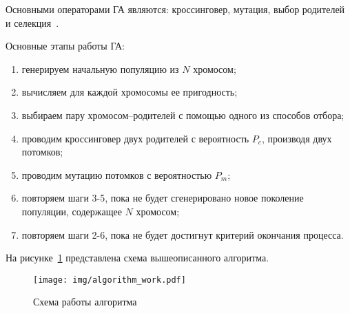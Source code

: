 Основными операторами ГА являются: кроссинговер, мутация, выбор родителей и селекция~\cite{GA}. 

Основные этапы работы ГА:
\begin{enumerate}
	\item генерируем начальную популяцию из $N$ хромосом;
	\item вычисляем для каждой хромосомы ее пригодность;
	\item выбираем пару хромосом--родителей с помощью одного из способов отбора;
	\item проводим кроссинговер двух родителей с вероятность $P_c$, производя двух потомков;
	\item проводим мутацию потомков с вероятностью $P_m$;
	\item повторяем шаги 3-5, пока не будет сгенерировано новое поколение популяции, содержащее $N$ хромосом;
	\item повторяем шаги 2-6, пока не будет достигнут критерий окончания процесса.
\end{enumerate}

На рисунке~\ref{figure:mashin01} представлена схема вышеописанного алгоритма. 
\begin{figure}[H]
	\centering
	\texttt{[image: img/algorithm\_work.pdf]}
	\caption{Схема работы алгоритма}
	\label{figure:mashin01}
\end{figure}


